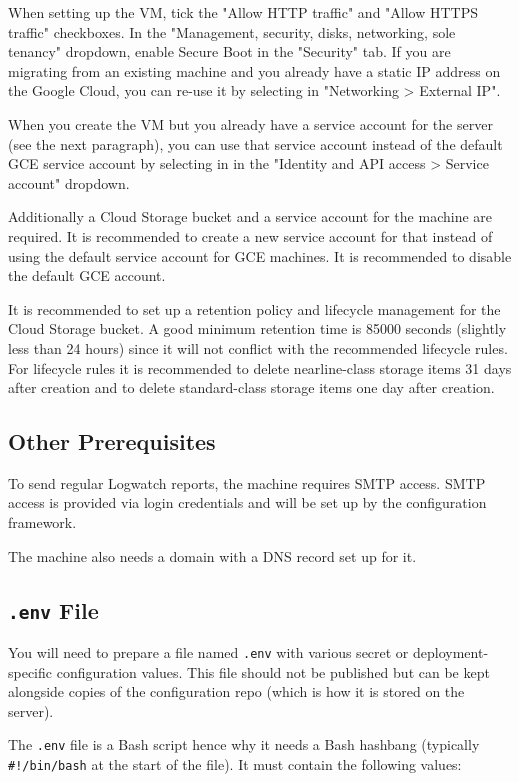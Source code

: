 \documentclass[12pt,a4paper]{report}
\begin{document}
	When setting up the VM, tick the "Allow HTTP traffic" and "Allow HTTPS traffic" checkboxes. In the "Management, security, disks, networking, sole tenancy" dropdown, enable Secure Boot in the "Security" tab. If you are migrating from an existing machine and you already have a static IP address on the Google Cloud, you can re-use it by selecting in "Networking > External IP".

	When you create the VM but you already have a service account for the server (see the next paragraph), you can use that service account instead of the default GCE service account by selecting in in the "Identity and API access > Service account" dropdown.

	Additionally a Cloud Storage bucket and a service account for the machine are required. It is recommended to create a new service account for that instead of using the default service account for GCE machines. It is recommended to disable the default GCE account.

	It is recommended to set up a retention policy and lifecycle management for the Cloud Storage bucket. A good minimum retention time is 85000 seconds (slightly less than 24 hours) since it will not conflict with the recommended lifecycle rules. For lifecycle rules it is recommended to delete nearline-class storage items 31 days after creation and to delete standard-class storage items one day after creation.

	\subsection{Other Prerequisites}
	To send regular Logwatch reports, the machine requires SMTP access. SMTP access is provided via login credentials and will be set up by the configuration framework.

	The machine also needs a domain with a DNS record set up for it.

	\subsection{\lstinline|.env| File}
	You will need to prepare a file named \lstinline|.env| with various secret or deployment-specific configuration values. This file should not be published but can be kept alongside copies of the configuration repo (which is how it is stored on the server).

	The \lstinline|.env| file is a Bash script hence why it needs a Bash hashbang (typically \lstinline|#!/bin/bash| at the start of the file). It must contain the following values:
\end{document}
